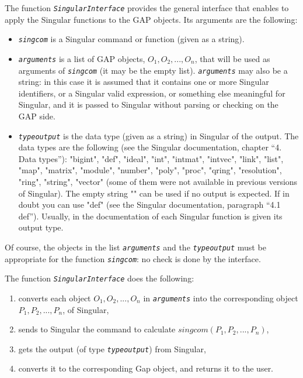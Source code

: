 \documentclass[a4paper,11pt]{report}
\begin{document}
{{{ The function \mbox{\texttt{\mdseries\slshape SingularInterface}} provides the general interface that enables to apply the \textsf{Singular} functions to the \textsf{GAP} objects. Its arguments are the following: 
\begin{itemize}
\item  \mbox{\texttt{\mdseries\slshape singcom}} is a \textsf{Singular} command or function (given as a string). 
\item  \mbox{\texttt{\mdseries\slshape arguments}} is a list of \textsf{GAP} objects, $O_1, O_2, ..., O_n$, that will be used as arguments of \mbox{\texttt{\mdseries\slshape singcom}} (it may be the empty list). \mbox{\texttt{\mdseries\slshape arguments}} may also be a string: in this case it is assumed that it contains one or more \textsf{Singular} identifiers, or a \textsf{Singular} valid expression, or something else meaningful for \textsf{Singular}, and it is passed to \textsf{Singular} without parsing or checking on the \textsf{GAP} side. 
\item  \mbox{\texttt{\mdseries\slshape type{\textunderscore}output}} is the data type (given as a string) in \textsf{Singular} of the output. The data types are the following (see the \textsf{Singular} documentation, chapter ``4. Data types''): "bigint", "def", "ideal", "int",
"intmat", "intvec", "link", "list", "map", "matrix", "module", "number",
"poly", "proc", "qring", "resolution", "ring", "string", "vector" (some of
them were not available in previous versions of \textsf{Singular}). The empty string "" can be used if no output is expected. If in doubt you
can use "def" (see the \textsf{Singular} documentation, paragraph ``4.1 def''). Usually, in the documentation of each \textsf{Singular} function is given its output type. 
\end{itemize}
 Of course, the objects in the list \mbox{\texttt{\mdseries\slshape arguments}} and the \mbox{\texttt{\mdseries\slshape type{\textunderscore}output}} must be appropriate for the function \mbox{\texttt{\mdseries\slshape singcom}}: no check is done by the interface. 

 The function \mbox{\texttt{\mdseries\slshape SingularInterface}} does the following: 
\begin{enumerate}
\item  converts each object $O_1, O_2, ..., O_n$ in \mbox{\texttt{\mdseries\slshape arguments}} into the corresponding object $P_1, P_2, ..., P_n$, of \textsf{Singular}, 
\item  sends to \textsf{Singular} the command to calculate $singcom ( P_1, P_2, ..., P_n )$, 
\item  gets the output (of type \mbox{\texttt{\mdseries\slshape type{\textunderscore}output}}) from \textsf{Singular}, 
\item  converts it to the corresponding Gap object, and returns it to the user. 
\end{enumerate}
 

}}}
\end{document}
